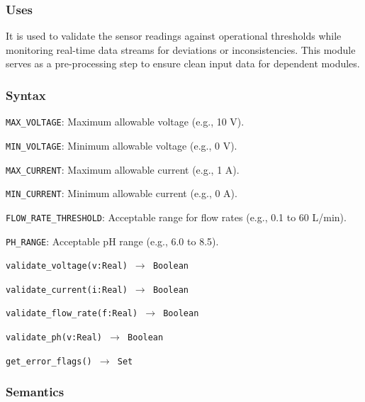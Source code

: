 \documentclass[12pt, titlepage]{article}
\begin{document}
\begin{description}
\subsubsection{Uses}
It is used to validate the sensor readings against operational thresholds while monitoring real-time 
data streams for deviations or inconsistencies. This module serves as a pre-processing step to ensure 
clean input data  for dependent modules.

\subsubsection{Syntax}
\begin{description}
  \item[Exported Constants:]
  \item 
  \texttt{MAX\_VOLTAGE}: Maximum allowable voltage (e.g., 10 V).
  \item
  \texttt{MIN\_VOLTAGE}: Minimum allowable voltage (e.g., 0 V).
  \item
  \texttt{MAX\_CURRENT}: Maximum allowable current (e.g., 1 A).
  \item
  \texttt{MIN\_CURRENT}: Minimum allowable current (e.g., 0 A).
  \item
  \texttt{FLOW\_RATE\_THRESHOLD}: Acceptable range for flow rates (e.g., 0.1 to 60 L/min).
  \item
  \texttt{PH\_RANGE}: Acceptable pH range (e.g., 6.0 to 8.5).
  \item
  \item[Exported Access Programs:]
  \item
  \texttt{validate\_voltage(v:Real) \(\to\) Boolean}
  \item 
  \texttt{validate\_current(i:Real) \(\to\) Boolean}
  \item 
  \texttt{validate\_flow\_rate(f:Real) \(\to\) Boolean}
  \item
  \texttt{validate\_ph(v:Real) \(\to\) Boolean}
  \item
  \texttt{get\_error\_flags() \(\to\) Set}
\end{description}

\subsubsection{Semantics}
\begin{description}


\end{description}
\end{description}
\end{document}
